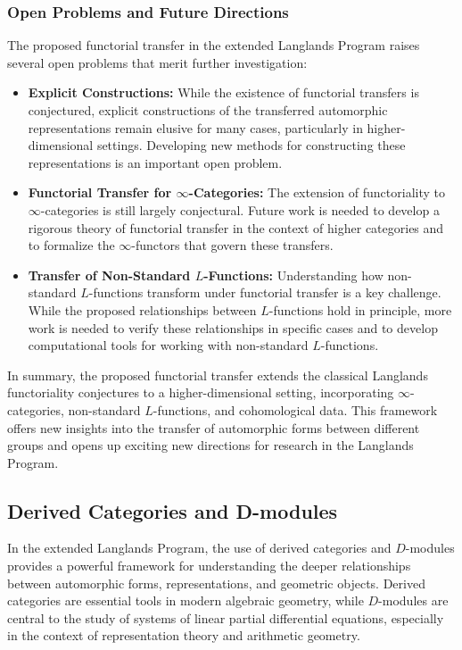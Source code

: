 \documentclass{article}
\theoremstyle{remark}
\begin{document}
\subsubsection{Open Problems and Future Directions}

The proposed functorial transfer in the extended Langlands Program raises several open problems that merit further investigation:
\begin{itemize}
    \item \textbf{Explicit Constructions:} While the existence of functorial transfers is conjectured, explicit constructions of the transferred automorphic representations remain elusive for many cases, particularly in higher-dimensional settings. Developing new methods for constructing these representations is an important open problem.
    
    \item \textbf{Functorial Transfer for $\infty$-Categories:} The extension of functoriality to $\infty$-categories is still largely conjectural. Future work is needed to develop a rigorous theory of functorial transfer in the context of higher categories and to formalize the $\infty$-functors that govern these transfers.
    
    \item \textbf{Transfer of Non-Standard $L$-Functions:} Understanding how non-standard $L$-functions transform under functorial transfer is a key challenge. While the proposed relationships between $L$-functions hold in principle, more work is needed to verify these relationships in specific cases and to develop computational tools for working with non-standard $L$-functions.
\end{itemize}

In summary, the proposed functorial transfer extends the classical Langlands functoriality conjectures to a higher-dimensional setting, incorporating $\infty$-categories, non-standard $L$-functions, and cohomological data. This framework offers new insights into the transfer of automorphic forms between different groups and opens up exciting new directions for research in the Langlands Program.

\subsection{Derived Categories and D-modules}

In the extended Langlands Program, the use of derived categories and $D$-modules provides a powerful framework for understanding the deeper relationships between automorphic forms, representations, and geometric objects. Derived categories are essential tools in modern algebraic geometry, while $D$-modules are central to the study of systems of linear partial differential equations, especially in the context of representation theory and arithmetic geometry.
\end{document}
